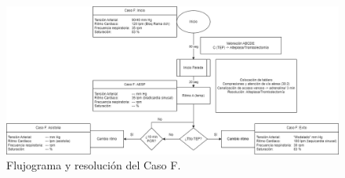 \begin{figure}[hptb]
    \centering
	\includegraphics[width=\linewidth]{./imagenes/ACV-AdSC-CasosUCI_CasoF.png}
	\caption{\label{fig:Brusilov:SVI:CasoD}Flujograma y resolución del Caso F.}
\end{figure}




